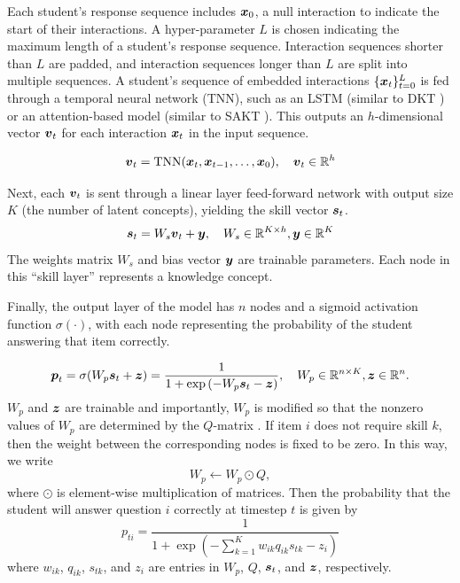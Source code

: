 Each student's response sequence includes $\boldsymbol{x}_0$, a null interaction to indicate the start of their interactions. A hyper-parameter $L$ is chosen indicating the maximum length of a student's response sequence. Interaction sequences shorter than $L$ are padded, and interaction sequences longer than $L$ are split into multiple sequences. A student's sequence of embedded interactions $\{\boldsymbol{x}_t\}_{t=0}^L$ is fed through a temporal neural network (TNN), such as an LSTM (similar to DKT \cite{piech2015}) or an attention-based model (similar to SAKT \cite{pandey2019}). This outputs an $h$-dimensional vector $\boldsymbol{v}_t$ for each interaction $\boldsymbol{x}_t$ in the input sequence.

\begin{equation}
  \boldsymbol{v}_t = \text{TNN}(\boldsymbol{x}_t, \boldsymbol{x}_{t-1}, \ldots, \boldsymbol{x}_0), \quad \boldsymbol{v}_t \in \mathbb{R}^h
  \label{eq:tsnn_layer}
\end{equation}

Next, each $\boldsymbol{v}_t$ is sent through a linear layer feed-forward network with output size $K$ (the number of latent concepts), yielding the skill vector $\boldsymbol{s}_t$.
\begin{equation}
  \boldsymbol{s}_t = W_s \boldsymbol{v}_t + \boldsymbol{y}, \quad W_s \in \mathbb{R}^{K\times h}, \boldsymbol{y} \in \mathbb{R}^K
  \label{eq:skill_layer}
\end{equation}
The weights matrix $W_s$ and bias vector $\boldsymbol{y}$ are trainable parameters. Each node in this ``skill layer'' represents a knowledge concept.

Finally, the output layer of the model has $n$ nodes and a sigmoid activation function $\sigma(\cdot)$, with each node representing the probability of the student answering that item correctly.

\begin{equation}
  \boldsymbol{p}_t = \sigma(W_p \boldsymbol{s}_t + \boldsymbol{z}) = \frac{1}{1 + \exp \left( -W_p \boldsymbol{s}_t - \boldsymbol{z} \right)}, \quad W_p \in \mathbb{R}^{n \times K}, \boldsymbol{z} \in \mathbb{R}^n.
  \label{eq:pred_layer}
\end{equation}
$W_p$ and $\boldsymbol{z}$ are trainable and importantly, $W_p$ is modified so that the nonzero values of $W_p$ are determined by the $Q$-matrix \cite{guo2017}\cite{ijcnn_paper}. If item $i$ does not require skill $k$, then the weight between the corresponding nodes is fixed to be zero. In this way, we write
\begin{equation}
  W_p \gets W_p \odot Q,
  \label{eq:weight_constraint}
\end{equation}
where $\odot$ is element-wise multiplication of matrices. Then the probability that the student will answer question $i$ correctly at timestep $t$ is given by 
\begin{equation}
  p_{ti} = \frac{1}{1 + \exp\left( -\sum_{k=1}^K w_{ik} q_{ik} s_{tk} - z_i \right)}
  \label{eq:nn_out}
\end{equation}
where $w_{ik}$, $q_{ik}$, $s_{tk}$, and $z_i$ are entries in $W_p$, $Q$, $\boldsymbol{s}_t$, and $\boldsymbol{z}$, respectively.

